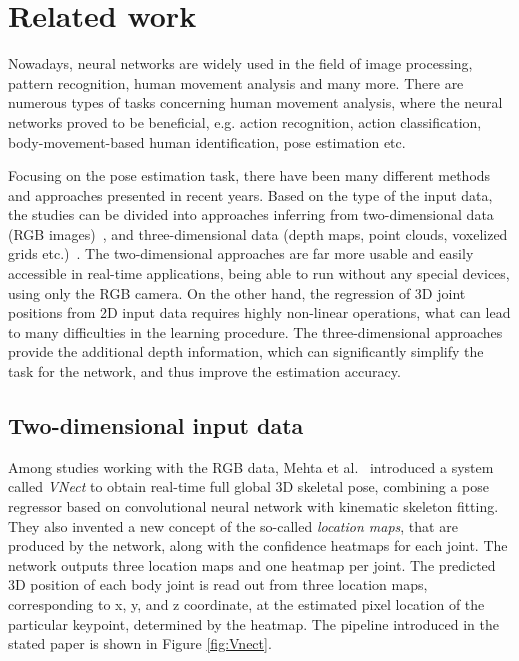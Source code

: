 
\chapter{Related work}\label{chap:related work}

Nowadays, neural networks are widely used in the field of image processing, pattern recognition, human movement analysis and many more. There are numerous types of tasks concerning human movement analysis, where the neural networks proved to be beneficial, e.g. action recognition, action classification, body-movement-based human identification, pose estimation etc.\par
\vspace{5mm}
\noindent Focusing on the pose estimation task, there have been many different methods and approaches presented in recent years. Based on the type of the input data, the studies can be divided into approaches inferring from two-dimensional data (RGB images)~\cite{DBLP:journals/corr/ChouCC17,mono-3dhp2017,VNect_SIGGRAPH2017,DBLP:journals/corr/abs-1907-00837,DBLP:journals/corr/NewellYD16,lcrnet,DBLP:journals/corr/abs-1902-09212}, and three-dimensional data (depth maps, point clouds, voxelized grids etc.)~\cite{Ali19,8100085,DBLP:journals/corr/GeLYT16,haque2016viewpoint,10.1016/j.patrec.2013.09.021,DBLP:journals/corr/abs-1711-07399,Shafaei16,5995316,6126310}. The two-dimensional approaches are far more usable and easily accessible in real-time applications, being able to run without any special devices, using only the RGB camera. On the other hand, the regression of 3D joint positions from 2D input data requires highly non-linear operations, what can lead to many difficulties in the learning procedure. The three-dimensional approaches provide the additional depth information, which can significantly simplify the task for the network, and thus improve the estimation accuracy.

\section{Two-dimensional input data}
\noindent Among studies working with the RGB data, Mehta et al.~\cite{VNect_SIGGRAPH2017} introduced a system called \textit{VNect} to obtain real-time full global 3D skeletal pose, combining a pose regressor based on convolutional neural network with kinematic skeleton fitting. They also invented a new concept of the so-called \textit{location maps}, that are produced by the network, along with the confidence heatmaps for each joint. The network outputs three location maps and one heatmap per joint. The predicted 3D position of each body joint is read out from three location maps, corresponding to x, y, and z coordinate, at the estimated pixel location of the particular keypoint, determined by the heatmap. The pipeline introduced in the stated paper is shown in Figure \ref{fig:Vnect}.\par

